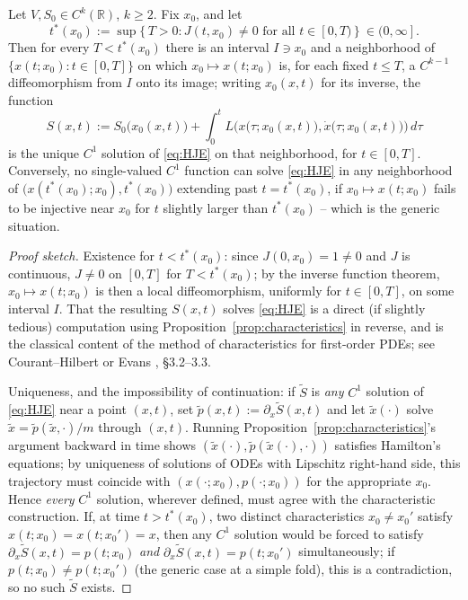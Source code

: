 \begin{theorem}
\label{thm:local}
Let $V,S_0\in C^k(\mathbb{R})$, $k\ge 2$. Fix $x_0$, and let
\begin{equation}
t^\ast(x_0) := \sup\{\,T>0 : J(t,x_0)\ne 0 \text{ for all } t\in[0,T)\,\} \ \in (0,\infty].
\label{eq:tstar}
\end{equation}
Then for every $T<t^\ast(x_0)$ there is an interval $I\ni x_0$ and a
    neighborhood of $\{x(t;x_0): t\in[0,T]\}$ on which $x_0\mapsto x(t;x_0)$
    is, for each fixed $t\le T$, a $C^{k-1}$ diffeomorphism from $I$ onto its
    image; writing $x_0(x,t)$ for its inverse, the function
\[
S(x,t) := S_0\big(x_0(x,t)\big) + \int_0^t L\Big(x\big(\tau;x_0(x,t)\big),
    \dot x\big(\tau;x_0(x,t)\big)\Big)\,d\tau
\]
is the unique $C^1$ solution of \eqref{eq:HJE} on that neighborhood, for
    $t\in[0,T]$. Conversely, no single-valued $C^1$ function can solve
    \eqref{eq:HJE} in any neighborhood of
    $\big(x(t^\ast(x_0);x_0),t^\ast(x_0)\big)$ extending past $t=t^\ast(x_0)$,
    if $x_0\mapsto x(t;x_0)$ fails to be injective near $x_0$ for $t$ slightly
    larger than $t^\ast(x_0)$ -- which is the generic situation.
\end{theorem}

\begin{proof}[Proof sketch]
Existence for $t<t^\ast(x_0)$: since $J(0,x_0)=1\ne0$ and $J$ is continuous,
    $J\ne0$ on $[0,T]$ for $T<t^\ast(x_0)$; by the inverse function theorem,
    $x_0\mapsto x(t;x_0)$ is then a local diffeomorphism, uniformly for
    $t\in[0,T]$, on some interval $I$. That the resulting $S(x,t)$ solves
    \eqref{eq:HJE} is a direct (if slightly tedious) computation using
    Proposition~\ref{prop:characteristics} in reverse, and is the classical
    content of the method of characteristics for first-order PDEs; see
    Courant--Hilbert \cite{CourantHilbert} or Evans \cite{Evans}, \S3.2--3.3.

Uniqueness, and the impossibility of continuation: if $\tilde S$ is \emph{any}
    $C^1$ solution of \eqref{eq:HJE} near a point $(x,t)$, set $\tilde
    p(x,t):=\partial_x\tilde S(x,t)$ and let $\tilde x(\cdot)$ solve
    $\dot{\tilde x}=\tilde p(\tilde x,\cdot)/m$ through $(x,t)$. Running
    Proposition~\ref{prop:characteristics}'s argument backward in time shows
    $(\tilde x(\cdot),\tilde p(\tilde x(\cdot),\cdot))$ satisfies Hamilton's
    equations; by uniqueness of solutions of ODEs with Lipschitz right-hand
    side, this trajectory must coincide with $(x(\cdot;x_0),p(\cdot;x_0))$ for
    the appropriate $x_0$. Hence \emph{every} $C^1$ solution, wherever defined,
    must agree with the characteristic construction. If, at time
    $t>t^\ast(x_0)$, two distinct characteristics $x_0\ne x_0'$ satisfy
    $x(t;x_0)=x(t;x_0')=x$, then any $C^1$ solution would be forced to satisfy
    $\partial_x\tilde S(x,t) = p(t;x_0)$ \emph{and} $\partial_x\tilde
    S(x,t)=p(t;x_0')$ simultaneously; if $p(t;x_0)\ne p(t;x_0')$ (the generic
    case at a simple fold), this is a contradiction, so no such $\tilde S$
    exists.
\end{proof}

